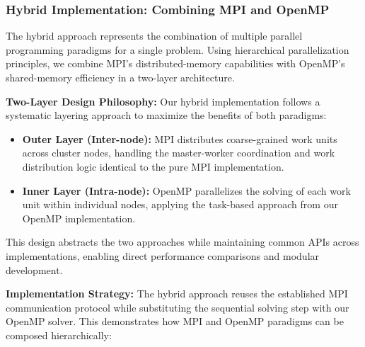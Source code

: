 \subsubsection{Hybrid Implementation: Combining MPI and OpenMP}
\label{subsubsec:hybrid_implementation}

The hybrid approach represents the combination of multiple parallel programming paradigms for a single problem. Using hierarchical parallelization principles, we combine MPI's distributed-memory capabilities with OpenMP's shared-memory efficiency in a two-layer architecture.

\textbf{Two-Layer Design Philosophy:}
Our hybrid implementation follows a systematic layering approach to maximize the benefits of both paradigms:

\begin{itemize}
    \item \textbf{Outer Layer (Inter-node):} MPI distributes coarse-grained work units across cluster nodes, handling the master-worker coordination and work distribution logic identical to the pure MPI implementation.
    \item \textbf{Inner Layer (Intra-node):} OpenMP parallelizes the solving of each work unit within individual nodes, applying the task-based approach from our OpenMP implementation.
\end{itemize}

This design abstracts the two approaches while maintaining common APIs across implementations, enabling direct performance comparisons and modular development.

\textbf{Implementation Strategy:}
The hybrid approach reuses the established MPI communication protocol while substituting the sequential solving step with our OpenMP solver. This demonstrates how MPI and OpenMP paradigms can be composed hierarchically:

